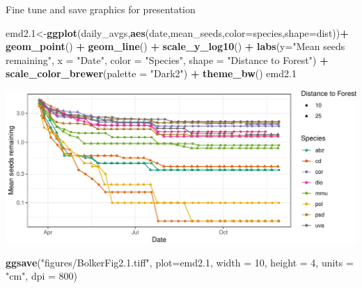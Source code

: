 \documentclass[
  ignorenonframetext,
]{beamer}
\newenvironment{Shaded}{\begin{snugshade}}{\end{snugshade}}
\newcommand{\DataTypeTok}[1]{\textcolor[rgb]{0.13,0.29,0.53}{#1}}
\newcommand{\DecValTok}[1]{\textcolor[rgb]{0.00,0.00,0.81}{#1}}
\newcommand{\FloatTok}[1]{\textcolor[rgb]{0.00,0.00,0.81}{#1}}
\newcommand{\KeywordTok}[1]{\textcolor[rgb]{0.13,0.29,0.53}{\textbf{#1}}}
\newcommand{\NormalTok}[1]{#1}
\newcommand{\OperatorTok}[1]{\textcolor[rgb]{0.81,0.36,0.00}{\textbf{#1}}}
\newcommand{\StringTok}[1]{\textcolor[rgb]{0.31,0.60,0.02}{#1}}
\begin{document}
\begin{frame}[fragile]{Fine tune and save graphics for presentation}
\protect\hypertarget{fine-tune-and-save-graphics-for-presentation}{}

\scriptsize

\begin{Shaded}
\begin{Highlighting}[]
\NormalTok{emd2}\FloatTok{.1}\NormalTok{<-}\KeywordTok{ggplot}\NormalTok{(daily_avgs,}\KeywordTok{aes}\NormalTok{(date,mean_seeds,}\DataTypeTok{color=}\NormalTok{species,}\DataTypeTok{shape=}\NormalTok{dist))}\OperatorTok{+}
\StringTok{  }\KeywordTok{geom_point}\NormalTok{() }\OperatorTok{+}\StringTok{ }\KeywordTok{geom_line}\NormalTok{() }\OperatorTok{+}\StringTok{ }\KeywordTok{scale_y_log10}\NormalTok{() }\OperatorTok{+}
\StringTok{  }\KeywordTok{labs}\NormalTok{(}\DataTypeTok{y=}\StringTok{"Mean seeds remaining"}\NormalTok{, }\DataTypeTok{x =} \StringTok{"Date"}\NormalTok{, }
       \DataTypeTok{color =} \StringTok{"Species"}\NormalTok{, }\DataTypeTok{shape =} \StringTok{"Distance to Forest"}\NormalTok{) }\OperatorTok{+}
\StringTok{  }\KeywordTok{scale_color_brewer}\NormalTok{(}\DataTypeTok{palette =} \StringTok{"Dark2"}\NormalTok{) }\OperatorTok{+}
\StringTok{  }\KeywordTok{theme_bw}\NormalTok{()}
\NormalTok{emd2}\FloatTok{.1}
\end{Highlighting}
\end{Shaded}

\includegraphics{data_viz_files/figure-beamer/unnamed-chunk-15-1.pdf}

\begin{Shaded}
\begin{Highlighting}[]
\KeywordTok{ggsave}\NormalTok{(}\StringTok{"figures/BolkerFig2.1.tiff"}\NormalTok{, }\DataTypeTok{plot=}\NormalTok{emd2}\FloatTok{.1}\NormalTok{, }
       \DataTypeTok{width =} \DecValTok{10}\NormalTok{, }\DataTypeTok{height =} \DecValTok{4}\NormalTok{, }\DataTypeTok{units =} \StringTok{"cm"}\NormalTok{, }\DataTypeTok{dpi =} \DecValTok{800}\NormalTok{)}
\end{Highlighting}
\end{Shaded}

\end{frame}
\end{document}
